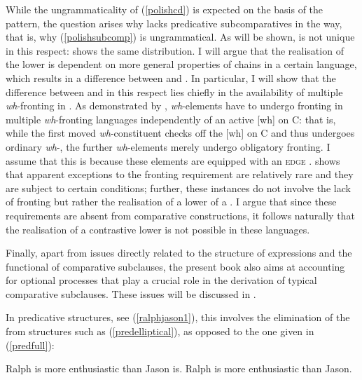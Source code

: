 While the ungrammaticality of (\ref{polishcd}) is expected on the basis of the  pattern, the question arises why  lacks predicative subcomparatives in the  way, that is, why (\ref{polishsubcomp}) is ungrammatical. As will be shown,  is not unique in this respect:  shows the same distribution. I will argue that the realisation of the lower  is dependent on more general properties of  chains in a certain language, which results in a difference between  and . In particular, I will show that the difference between  and  in this respect lies chiefly in the availability of multiple \textit{wh}-fronting in . As demonstrated by \citet{boskovic2002}, \textit{wh}-elements have to undergo fronting in multiple \textit{wh}-fronting languages independently of an active [wh]  on C: that is, while the first moved \textit{wh}-constituent checks off the [wh]  on C and thus undergoes ordinary \textit{wh}-, the further \textit{wh}-elements merely undergo obligatory fronting. I assume that this is because these elements are equipped with an \textsc{edge} . \citet{boskovic2002} shows that apparent exceptions to the fronting requirement are relatively rare and they are subject to certain conditions; further, these instances do not involve the lack of fronting but rather the realisation of a lower  of a . I argue that since these requirements are absent from comparative constructions, it follows naturally that the realisation of a contrastive lower  is not possible in these languages.

Finally, apart from issues directly related to the structure of  expressions and the functional  of comparative subclauses, the present book also aims at accounting for optional  processes that play a crucial role in the derivation of typical comparative subclauses. These issues will be discussed in .

In  predicative structures, see (\ref{ralphjason1}), this involves the elimination of the  from structures such as (\ref{predelliptical}), as opposed to the one given in (\ref{predfull}):

\ea \label{ralphjason1}
\ea	Ralph is more enthusiastic than Jason is. \label{predfull}
\ex	Ralph is more enthusiastic than Jason. \label{predelliptical}
\z
\z

